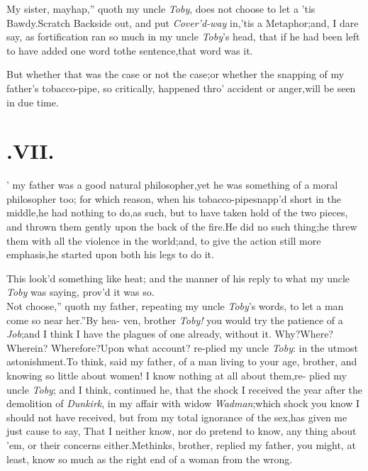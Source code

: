 \documentclass{article}
\begin{document}
\tsh \lqq My sister, mayhap,” quoth my uncle \textit{Toby},
\lqq does not choose to let a
’tis Bawdy.\tsk Scratch Backside out, and put
\textit{Cover’d-way} in,\tsk ’tis a Metaphor;\tsk\break and, I dare say, as
fortification ran so much in my uncle \textit{Toby}’s head, that if he had
been left to have added one word to\break the sentence,\tsh that word was
it.


But whether that was the case or not the case;\tsk or whether
the snapping of my father’s tobacco-pipe, so critically,
happened thro’ accident or anger,\tsk will be seen in due time.\\
\newpage
\section{.\enspace  VII.}

’ my father was a good natural
philosopher,\tsk yet he was something of a moral philosopher
too; for which reason, when his tobacco-pipe\break snapp’d short
in the middle,\tsk he had nothing to do,\tsk as such,\tsk
but to have taken hold of the two pieces, and thrown them
gently upon the back of the fire.\tsh\break He did no such
thing;\tsh he threw them with all the violence in the
world;\tsk and, to give the action still more
emphasis,\tsk\break he started upon both his legs to\break
do it.

This look’d something like heat;\tsh\break
and the manner of his reply to what\break
my uncle \textit{Toby} was saying, prov’d it\break
was so.\\
\newpage
\tsh \lqq Not choose,” quoth my father,
repeating my uncle \textit{Toby}’s words, \lqq to let\break
\lqq a man come so near her.”\tsh By hea-\break
ven, brother \textit{Toby!} you would try the patience of a
\textit{Job};\tsk and I think I have the plagues of one
already, without it.\break
\tsh Why?\tsh Where?\tsh Wherein?\tsh\break
Wherefore?\tsh Upon what account? re-\break plied my uncle \textit{Toby}: in the utmost
asto\-nishment.\tsk To think, said my father, of a man living to
your age, brother, and knowing so little about
women!\tsh\break
I know nothing at all about them,\tsk re-\break
plied
my uncle \textit{Toby}; and I think, continued he, that the shock I
received the year after the demolition of \textit{Dunkirk}, in my
affair with widow \textit{Wadman};\tsk which shock you know I
should not have received, but from my total ignorance of the
sex,\tsk has given me just cause to say, That I neither
know, nor do pretend to
know, any thing about ’em, or their\break
concerns either.\tsh Methinks, brother,\break
replied my father, you might, at least,\break
know so much as the right end of a\break
woman from the wrong.
\end{document}
